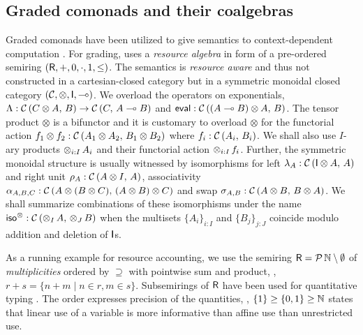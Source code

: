 \documentclass[acmsmall,review,anonymous]{acmart}\settopmatter{printfolios=true,printccs=false,printacmref=false}
\begin{document}

\subsection{Graded comonads and their coalgebras}

Graded comonads have been utilized to give semantics to
context-dependent computation \citep{orchard:icfp14}.  For grading,
\loccit uses a \emph{resource algebra} in form of a pre-ordered
semiring
$(\mathsf{R},{+},0,{\cdot},1,\leq)$.
%
The semantics is \emph{resource aware} and thus not constructed in a
cartesian-closed category but in a symmetric monoidal closed category
$(\mathcal{C},\otimes,\mathsf{I},\multimap)$.  We overload the operators on
exponentials, $\Lambda : \mathcal{C}\,(C \otimes A,\,B) \to \mathcal{C}\,(C,\,A \multimap B)$
and $\mathsf{eval} : \mathcal{C}\,((A \multimap B) \otimes A,\,B)$.  The tensor product
$\otimes$ is a bifunctor and it is customary to overload $\otimes$ for
the functorial action
$f_1 \otimes f_2 : \mathcal{C}\,(A_1 \otimes A_2,\,B_1 \otimes B_2)$ where
$f_i : \mathcal{C}\,(A_i,\,B_i)$.  We shall also use $I$-ary products
$\mathop\otimes_{i:I} A_i$ and their functorial action $\mathop\otimes_{i:I} f_i$.
Further, the symmetric monoidal structure is usually witnessed by
isomorphisms for left $\lambda_A : \mathcal{C}\,(\mathsf{I} \otimes A,\,A)$ and right
unit $\rho_A : \mathcal{C}\,(A \otimes I,\,A)$, associativity
$\alpha_{A,B,C} : \mathcal{C}\,(A \otimes (B \otimes C),\,(A \otimes B) \otimes
  C)$
and swap $\sigma_{A,B} : \mathcal{C}\,(A \otimes B,\,B \otimes A)$.  We shall
summarize combinations of these isomorphisms under the name
$\mathsf{iso}^\otimes : \mathcal{C}\,(\mathop\otimes_{I} A,\,\mathop\otimes_{J} B)$ when the multisets
$\{A_i\}_{i:I}$ and $\{B_j\}_{j:J}$ coincide modulo addition and
deletion of $\mathsf{I}$s.


As a running example for resource accounting,
we use the semiring $\mathsf{R} = \mathcal{P}\,\mathbb{N} \setminus \emptyset$ of
\emph{multiplicities} ordered by $\supseteq$ with pointwise sum and
product, \eg, $r + s = \{ n + m \mid n \in r, m \in s \}$.
Subsemirings of $\mathsf{R}$ have been used for quantitative typing
\cite{sergeyVytiniotisPeytonJones:popl14,mcBride:wadler60,atkey:lics08}.
The order expresses precision of the quantities, \eg,
$\{1\} \geq \{0,1\} \geq \mathbb{N}$ states that linear use of a variable is more informative than affine use than unrestricted use.
\end{document}
